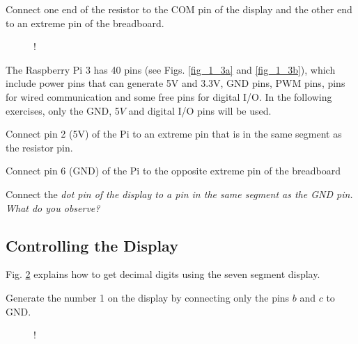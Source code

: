 %

\begin{problem}
	Connect one end of the resistor to the COM pin of the display and the other end to an extreme pin of the breadboard.	
\end{problem}
%
%
\begin{figure}[!h]
\begin{center}
 {!} {

}
\end{center}
\caption{}
\label{fig:sevenseg}
\end{figure}

The Raspberry Pi 3 has 40 pins (see Figs. \ref{fig_1_3a} and \ref{fig_1_3b}), which include power pins that can generate 5V and 3.3V, GND pins, PWM pins, pins for wired communication and some free pins for digital I/O.  In the following exercises, only the GND, 5$V$ and digital I/O pins will be used.

%
%
\begin{problem}
	Connect pin 2 (5V) of the Pi to an  extreme pin that is in the same segment as the resistor pin. 
	\end{problem}	
\begin{problem}
	Connect pin 6 (GND) of the Pi to the opposite extreme pin of the breadboard
\end{problem}
\begin{problem}
	Connect the \em{dot} pin of the display to a pin in the same segment as the GND pin.  What do you observe?
\end{problem}
\subsection{Controlling the Display}
Fig. \ref{fig:sevenseg12} explains how to get decimal digits using the seven segment display. 
\begin{problem}
	Generate the number 1 on the display by connecting only the pins $b$ and $c$ to GND. 
\end{problem}	
%
\begin{figure}[!h]
\begin{center}
 {!} {

}
\end{center}
\caption{}
\label{fig:sevenseg12}
\end{figure}

